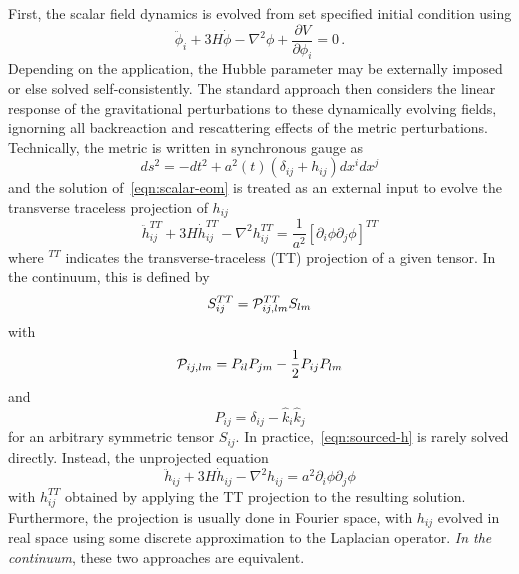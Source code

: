 \documentclass{revtex4}
\begin{document}
First, the scalar field dynamics is evolved from set specified initial condition using
\begin{equation}
  \label{eqn:scalar-eom}
  \ddot{\phi}_i + 3H\dot{\phi} - \nabla^2\phi + \frac{\partial V}{\partial \phi_i} = 0 \, .
\end{equation}
Depending on the application, the Hubble parameter may be externally imposed or else solved self-consistently.
The standard approach then considers the linear response of the gravitational perturbations to these dynamically evolving fields, ignorning all backreaction and rescattering effects of the metric perturbations.
Technically, the metric is written in synchronous gauge as
\begin{equation}
  ds^2 = -dt^2 + a^2(t)(\delta_{ij} + h_{ij})dx^idx^j
\end{equation}
and the solution of~\eqref{eqn:scalar-eom} is treated as an external input to evolve the transverse traceless projection of $h_{ij}$
\begin{equation}
  \label{eqn:sourced-h-tt}
  \ddot{h}_{ij}^{TT} + 3H\dot{h}_{ij}^{TT} - \nabla^2h_{ij}^{TT} = \frac{1}{a^2}\left[\partial_i\phi\partial_j\phi\right]^{TT}
\end{equation}
where ${}^{TT}$ indicates the transverse-traceless (TT) projection of a given tensor.
In the continuum, this is defined by
\begin{equation}
  \label{eqn:tt-proj}
  S_{ij}^{TT} = \mathcal{P}_{ij,lm}^{TT}S_{lm}
\end{equation}
with
\begin{equation}
  \label{eqn:proj-TT}
  \mathcal{P}_{ij,lm} = P_{il}P_{jm} - \frac{1}{2}P_{ij}P_{lm}
\end{equation}
and
\begin{equation}
  \label{eqn:proj-simple}
  P_{ij} = \delta_{ij} - \hat{k}_i\hat{k}_j
\end{equation}
for an arbitrary symmetric tensor $S_{ij}$.
In practice,~\eqref{eqn:sourced-h} is rarely solved directly.
Instead, the unprojected equation
\begin{equation}
  \label{eqn:sourced-h-full}
  \ddot{h}_{ij} + 3H\dot{h}_{ij} - \nabla^2h_{ij} = a^2\partial_i\phi\partial_j\phi
\end{equation}
with $h_{ij}^{TT}$ obtained by applying the TT projection to the resulting solution.
Furthermore, the projection is usually done in Fourier space, with $h_{ij}$ evolved in real space using some discrete approximation to the Laplacian operator.
\emph{In the continuum}, these two approaches are equivalent. 
\end{document}
